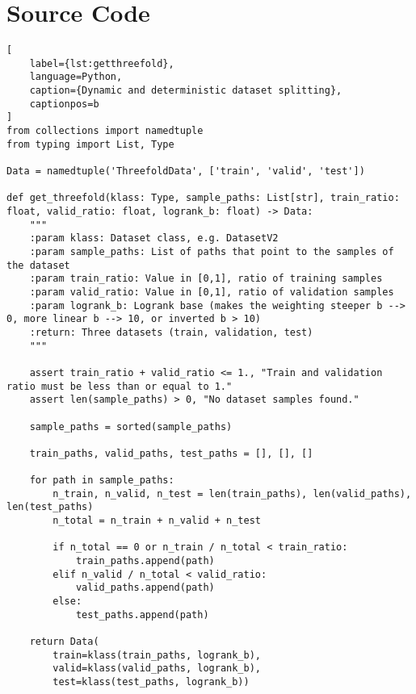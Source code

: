 \clearpage
\appendix

\clearpage
\clearpage

\section{Source Code}

\begin{lstlisting}[
    label={lst:getthreefold},
    language=Python,
    caption={Dynamic and deterministic dataset splitting},
    captionpos=b
]
from collections import namedtuple
from typing import List, Type

Data = namedtuple('ThreefoldData', ['train', 'valid', 'test'])

def get_threefold(klass: Type, sample_paths: List[str], train_ratio: float, valid_ratio: float, logrank_b: float) -> Data:
    """
    :param klass: Dataset class, e.g. DatasetV2
    :param sample_paths: List of paths that point to the samples of the dataset
    :param train_ratio: Value in [0,1], ratio of training samples
    :param valid_ratio: Value in [0,1], ratio of validation samples
    :param logrank_b: Logrank base (makes the weighting steeper b --> 0, more linear b --> 10, or inverted b > 10)
    :return: Three datasets (train, validation, test)
    """

    assert train_ratio + valid_ratio <= 1., "Train and validation ratio must be less than or equal to 1."
    assert len(sample_paths) > 0, "No dataset samples found."

    sample_paths = sorted(sample_paths)

    train_paths, valid_paths, test_paths = [], [], []

    for path in sample_paths:
        n_train, n_valid, n_test = len(train_paths), len(valid_paths), len(test_paths)
        n_total = n_train + n_valid + n_test

        if n_total == 0 or n_train / n_total < train_ratio:
            train_paths.append(path)
        elif n_valid / n_total < valid_ratio:
            valid_paths.append(path)
        else:
            test_paths.append(path)

    return Data(
        train=klass(train_paths, logrank_b),
        valid=klass(valid_paths, logrank_b),
        test=klass(test_paths, logrank_b))
\end{lstlisting}

